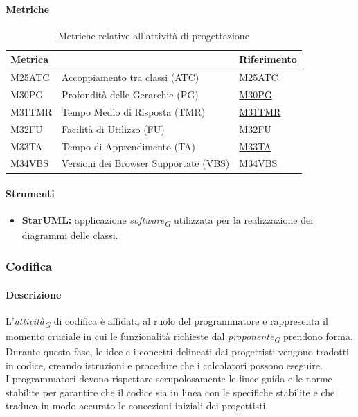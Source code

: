 \paragraph{Metriche}
\begin{table}[H]
    \centering
    \begin{tabular}{|C{3cm}|C{4cm}|C{3cm}|}
    \hline
    \textbf{Metrica} &  & \textbf{Riferimento} \\
    \hline \hline
    M25ATC & Accoppiamento tra classi (ATC) & \hyperlink{item:M25ATC}{M25ATC}\\
    M30PG & Profondità delle Gerarchie (PG) &  \hyperlink{item:M30PG}{M30PG}\\
    M31TMR & Tempo Medio di Risposta (TMR) & \hyperlink{item:M31TMR}{M31TMR}\\
    M32FU & Facilità di Utilizzo (FU) & \hyperlink{item:M32FU}{M32FU}\\
    M33TA & Tempo di Apprendimento (TA) & \hyperlink{item:M33TA}{M33TA}\\
    M34VBS & Versioni dei Browser Supportate (VBS) & \hyperlink{item:M34VBS}{M34VBS}\\
    \hline
    \end{tabular}
    \caption{Metriche relative all'attività di progettazione}
\end{table}

\paragraph{Strumenti}
\begin{itemize}
    \item \textbf{StarUML:} applicazione \textit{software}\textsubscript{\textit{G}} utilizzata per la realizzazione dei diagrammi delle classi.
\end{itemize}

\subsubsection{Codifica}
\paragraph{Descrizione}
L'\textit{attività}\textsubscript{\textit{G}} di codifica è affidata al ruolo del programmatore e rappresenta il momento cruciale in cui le funzionalità richieste dal \textit{proponente}\textsubscript{\textit{G}} prendono forma. \\
Durante questa fase, le idee e i concetti delineati dai progettisti vengono tradotti in codice, creando istruzioni e procedure che i calcolatori possono eseguire. \\
I programmatori devono rispettare scrupolosamente le linee guida e le norme stabilite per garantire che il codice sia in linea con le specifiche stabilite e che traduca in modo accurato le concezioni iniziali dei progettisti.
